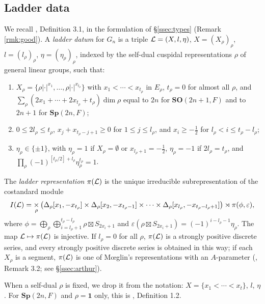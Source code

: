 \documentclass[a4paper,12pt,leqno]{amsart}
\theoremstyle{plain}
\theoremstyle{definition}
\begin{document}
\subsection{Ladder data}
We recall \cite{Ato24}, Definition 3.1, in the formulation of \S\ref{ssec:types} (Remark
\ref{rmk:good}). A \emph{ladder datum} for $G_n$ is a triple $\mathcal{L}=(X,l,\eta)$,
$X=(X_\rho)_\rho$, $l=(l_\rho)_\rho$, $\eta=(\eta_\rho)_\rho$, indexed by the self-dual cuspidal
representations $\rho$ of general linear groups, such that:
\begin{enumerate}
\item $X_\rho=\{\rho|\cdot|^{x_1},\ldots,\rho|\cdot|^{x_{t_\rho}}\}$ with $x_1<\cdots<x_{t_\rho}$ in
$E_\rho$, $t_\rho=0$ for almost all $\rho$, and
$\sum_\rho(2x_1+\cdots+2x_{t_\rho}+t_\rho)\dim\rho$ equal to $2n$ for $\mathbf{SO}(2n+1,F)$ and to
$2n+1$ for $\mathbf{Sp}(2n,F)$;
\item $0\leq2l_\rho\leq t_\rho$, $x_j+x_{t_\rho-j+1}\geq0$ for $1\leq j\leq l_\rho$, and
$x_i\geq-\tfrac12$ for $l_\rho<i\leq t_\rho-l_\rho$;
\item $\eta_\rho\in\{\pm1\}$, with $\eta_\rho=1$ if $X_\rho=\emptyset$ or $x_{l_\rho+1}=-\tfrac12$,
$\eta_\rho=-1$ if $2l_\rho=t_\rho$, and $\prod_\rho(-1)^{[t_\rho/2]+l_\rho}\eta_\rho^{t_\rho}=1$.
\end{enumerate}
The \emph{ladder representation} $\pi(\mathcal{L})$ is the unique irreducible subrepresentation of the
costandard module
\[I(\mathcal{L})=\mathop{\times}_\rho\big(\Delta_\rho[x_1,-x_{t_\rho}]\times\Delta_\rho[x_2,-x_{t_\rho-1}]
\times\cdots\times\Delta_\rho[x_{l_\rho},-x_{t_\rho-l_\rho+1}]\big)\rtimes\pi(\phi,\varepsilon),\]
where $\phi=\bigoplus_\rho\bigoplus_{i=l_\rho+1}^{t_\rho-l_\rho}\rho\boxtimes S_{2x_i+1}$ and
$\varepsilon(\rho\boxtimes S_{2x_i+1})=(-1)^{i-l_\rho-1}\eta_\rho$. The map $\mathcal{L}\mapsto\pi(\mathcal{L})$ is
injective. If $l_\rho=0$ for all $\rho$, $\pi(\mathcal{L})$ is a strongly positive discrete series, and every
strongly positive discrete series is obtained in this way; if each $X_\rho$ is a segment, $\pi(\mathcal{L})$ is
one of M\oe glin's representations with an $A$-parameter (\cite{Ato24}, Remark 3.2; see
\S\ref{ssec:arthur}).

When a self-dual $\rho$ is fixed, we drop it from the notation: $X=\{x_1<\cdots<x_t\}$, $l$, $\eta$.
For $\mathbf{Sp}(2n,F)$ and $\rho=\mathbf 1$ only, this is \cite{Ato24}, Definition 1.2.
\end{document}
